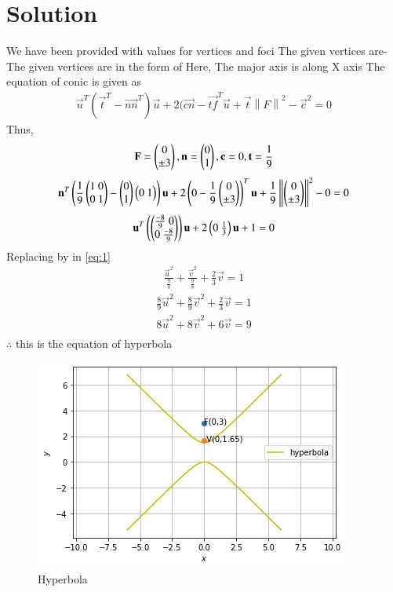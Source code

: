 \documentclass[journal,12pt,twocolumn]{IEEEtran}
\newcommand{\norm}[1]{\left\lVert#1\right\rVert}
\begin{document}
\section{Solution}
We have been provided with values for vertices and foci
\newline
The given vertices are- 
\newline
The given vertices are in the form of 
Here, The major axis is along X axis
\newline
The equation of conic is given as 
\begin{align}
\vec{u}^T(\vec{t}^T-\vec{nn}^T) \vec{u}+2(\vec{cn}-\vec{tf}^T\vec{u}+\vec{t}\norm{F}^2-\vec{c}^2=0
\end{align}
Thus,
\begin{align}
\mathbf{F}=\begin{pmatrix}0\\\pm 3\end{pmatrix}, \mathbf{n}= \begin{pmatrix}0\\1\end{pmatrix},\mathbf{c}=0, \mathbf{t}=\frac{1}{9}
\end{align}
\begin{align}\label{eq:1}
\vec{n}^T\brak{\frac{1}{9}\myvec{1\ 0\\ 0\ 1}-\myvec{0\\1}\myvec{0\ 1}}\vec{u}+2\brak{0-\frac{1}{9}\myvec{0\\\pm3}}^T\vec{u}+\frac{1}{9}\norm{\myvec{0\\\pm3}}^2-0=0
\end{align}
\begin{align}
\vec{u}^T\brak{\myvec{\frac{-8}{9}\ 0 \\ 0\ \frac{-8}{9}}}\vec{u}+2\myvec{0 \ \frac{1}{3}}\vec{u}+1=0
\end{align}
Replacing  by  in \eqref{eq:1}
\begin{align}
\frac{\vec{u}^2}{\frac{9}{8}}+\frac{\vec{v}^2}{\frac{9}{8}}+\frac{2}{3}\vec{v}=1
\end{align}
\begin{align}
\frac{8}{9}\vec{u}^2+\frac{8}{9}\vec{v}^2+\frac{2}{3}\vec{v}=1
\end{align}
\begin{align}
 8\vec{u}^2+8\vec{v}^2+6\vec{v}=9\\
\end{align}
$\therefore$ this is the equation of hyperbola 
\begin{figure}[ht]
\centering
\includegraphics[width=\columnwidth]{download.png}
\caption{Hyperbola}
\label{Hyperbola along given axis}
\end{figure}
\end{document}

